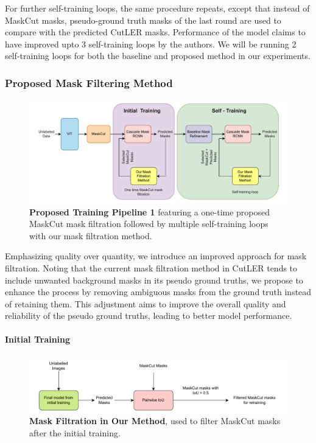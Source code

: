 For further self-training loops, the same procedure repeats, except that instead of MaskCut masks, pseudo-ground truth masks of the last round are used to compare with the predicted CutLER masks. Performance of the model claims to have improved upto 3 self-training loops by the authors. We will be running 2 self-training loops for both the baseline and proposed method in our experiments.


\subsubsection{Proposed Mask Filtering Method}
\label{section:proposed_method}

\begin{figure}
	\centering
	\includegraphics[width=1\textwidth]{Images/main/proposed_method_last.pdf}
	\caption[\textbf{Proposed Training Pipeline 1}]{\textbf{Proposed Training Pipeline 1} featuring a one-time proposed MaskCut mask filtration followed by multiple self-training loops with our mask filtration method.}
	\label{fig:proposed_training}
\end{figure}
Emphasizing quality over quantity, we introduce an improved approach for mask filtration. Noting that the current mask filtration method in CutLER tends to include unwanted background masks in its pseudo ground truths, we propose to enhance the process by removing ambiguous masks from the ground truth instead of retaining them. This adjustment aims to improve the overall quality and reliability of the pseudo ground truths, leading to better model performance.

\paragraph{Initial Training}
\begin{figure}
	\centering
	\includegraphics[width=1\textwidth]{Images/main/our_mask_filtration_1.pdf}
	\caption[\textbf{Mask Filtration in Proposed Method}]{\textbf{Mask Filtration in Our Method}, used to filter MaskCut masks after the initial training.}
	\label{fig:our_mask_filtration}
\end{figure}

